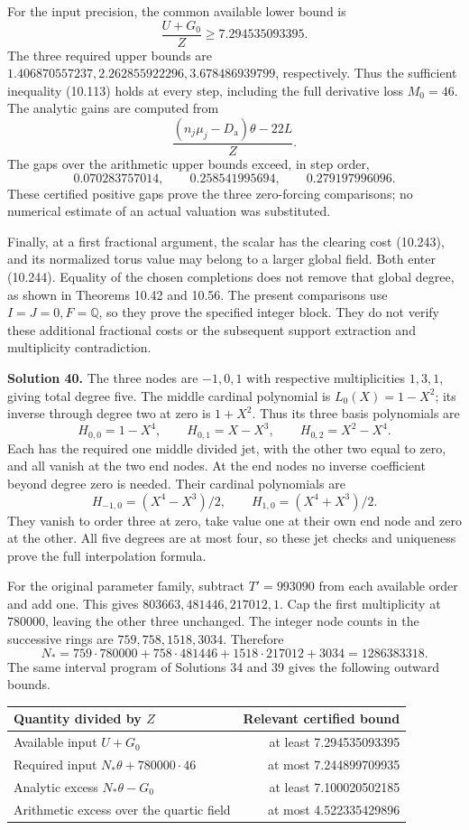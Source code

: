 \documentclass[
  11pt,
  a4paper,
]{article}
\newcounter{none} %
\begin{document}
For the input precision, the common available lower bound is \[
\frac{U+G_0}{Z}\ge7.294535093395.
\] The three required upper bounds are
\(1.406870557237,2.262855922296,3.678486939799\), respectively. Thus the
sufficient inequality (10.113) holds at every step, including the full
derivative loss \(M_0=46\). The analytic gains are computed from \[
\frac{(n_j\mu_j-D_{\mathrm a})\theta-22L}{Z}.
\] The gaps over the arithmetic upper bounds exceed, in step order, \[
0.070283757014,\qquad0.258541995694,\qquad0.279197996096.
\] These certified positive gaps prove the three zero-forcing
comparisons; no numerical estimate of an actual valuation was
substituted.

Finally, at a first fractional argument, the scalar has the clearing
cost (10.243), and its normalized torus value may belong to a larger
global field. Both enter (10.244). Equality of the chosen completions
does not remove that global degree, as shown in Theorems 10.42 and
10.56. The present comparisons use \(I=J=0,F=\mathbb Q\), so they prove
the specified integer block. They do not verify these additional
fractional costs or the subsequent support extraction and multiplicity
contradiction.

\textbf{Solution 40.} The three nodes are \(-1,0,1\) with respective
multiplicities \(1,3,1\), giving total degree five. The middle cardinal
polynomial is \(L_0(X)=1-X^2\); its inverse through degree two at zero
is \(1+X^2\). Thus its three basis polynomials are \[
H_{0,0}=1-X^4,\qquad H_{0,1}=X-X^3,\qquad H_{0,2}=X^2-X^4.
\] Each has the required one middle divided jet, with the other two
equal to zero, and all vanish at the two end nodes. At the end nodes no
inverse coefficient beyond degree zero is needed. Their cardinal
polynomials are \[
H_{-1,0}=(X^4-X^3)/2,\qquad H_{1,0}=(X^4+X^3)/2.
\] They vanish to order three at zero, take value one at their own end
node and zero at the other. All five degrees are at most four, so these
jet checks and uniqueness prove the full interpolation formula.

For the original parameter family, subtract \(T'=993090\) from each
available order and add one. This gives \(803663,481446,217012,1\). Cap
the first multiplicity at \(780000\), leaving the other three unchanged.
The integer node counts in the successive rings are
\(759,758,1518,3034\). Therefore \[
N_*=759\cdot780000+758\cdot481446+
1518\cdot217012+3034=1286383318.
\] The same interval program of Solutions 34 and 39 gives the following
outward bounds.

{\def\LTcaptype{none} %
\begin{longtable}[]{@{}lr@{}}
\toprule\noalign{}
Quantity divided by \(Z\) & Relevant certified bound \\
\midrule\noalign{}
\endhead
\bottomrule\noalign{}
\endlastfoot
Available input \(U+G_0\) & at least 7.294535093395 \\
Required input \(N_*\theta+780000\cdot46\) & at most 7.244899709935 \\
Analytic excess \(N_*\theta-G_0\) & at least 7.100020502185 \\
Arithmetic excess over the quartic field & at most 4.522335429896 \\
\end{longtable}
}
\end{document}
